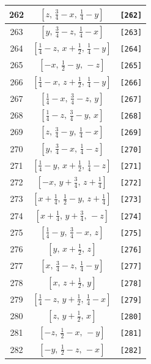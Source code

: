 \documentclass[fleqn,8pt]{jsarticle}
\begin{document}
\begin{longtable}{ccc}
262 & $\left[ z,\, \frac{3}{4} - x,\, \frac{1}{4} - y \right]$ & {\tt [262]} \\ \hline
263 & $\left[ y,\, \frac{3}{4} - z,\, \frac{1}{4} - x \right]$ & {\tt [263]} \\ \hline
264 & $\left[ \frac{1}{4} - z,\, x + \frac{1}{2},\, \frac{1}{4} - y \right]$ & {\tt [264]} \\ \hline
265 & $\left[ - x,\, \frac{1}{2} - y,\, - z \right]$ & {\tt [265]} \\ \hline
266 & $\left[ \frac{1}{4} - x,\, z + \frac{1}{2},\, \frac{1}{4} - y \right]$ & {\tt [266]} \\ \hline
267 & $\left[ \frac{1}{4} - x,\, \frac{3}{4} - z,\, y \right]$ & {\tt [267]} \\ \hline
268 & $\left[ \frac{1}{4} - z,\, \frac{3}{4} - y,\, x \right]$ & {\tt [268]} \\ \hline
269 & $\left[ z,\, \frac{3}{4} - y,\, \frac{1}{4} - x \right]$ & {\tt [269]} \\ \hline
270 & $\left[ y,\, \frac{3}{4} - x,\, \frac{1}{4} - z \right]$ & {\tt [270]} \\ \hline
271 & $\left[ \frac{1}{4} - y,\, x + \frac{1}{2},\, \frac{1}{4} - z \right]$ & {\tt [271]} \\ \hline
272 & $\left[ - x,\, y + \frac{3}{4},\, z + \frac{1}{4} \right]$ & {\tt [272]} \\ \hline
273 & $\left[ x + \frac{1}{4},\, \frac{1}{2} - y,\, z + \frac{1}{4} \right]$ & {\tt [273]} \\ \hline
274 & $\left[ x + \frac{1}{4},\, y + \frac{3}{4},\, - z \right]$ & {\tt [274]} \\ \hline
275 & $\left[ \frac{1}{4} - y,\, \frac{3}{4} - x,\, z \right]$ & {\tt [275]} \\ \hline
276 & $\left[ y,\, x + \frac{1}{2},\, z \right]$ & {\tt [276]} \\ \hline
277 & $\left[ x,\, \frac{3}{4} - z,\, \frac{1}{4} - y \right]$ & {\tt [277]} \\ \hline
278 & $\left[ x,\, z + \frac{1}{2},\, y \right]$ & {\tt [278]} \\ \hline
279 & $\left[ \frac{1}{4} - z,\, y + \frac{1}{2},\, \frac{1}{4} - x \right]$ & {\tt [279]} \\ \hline
280 & $\left[ z,\, y + \frac{1}{2},\, x \right]$ & {\tt [280]} \\ \hline
281 & $\left[ - z,\, \frac{1}{2} - x,\, - y \right]$ & {\tt [281]} \\ \hline
282 & $\left[ - y,\, \frac{1}{2} - z,\, - x \right]$ & {\tt [282]} \\ \hline

\end{longtable}
\end{document}
